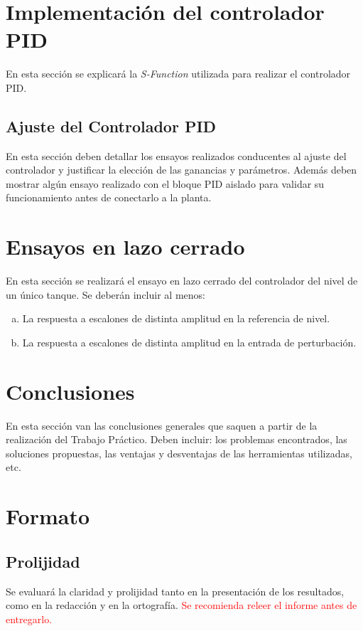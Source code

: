 \documentclass[10pt]{article}
\begin{document}
\section{Implementación del controlador PID}
En esta sección se explicará la \textit{S-Function} utilizada para realizar el controlador PID.

\subsection{Ajuste del Controlador PID}
En esta sección deben detallar los ensayos realizados conducentes al ajuste del controlador y justificar la elección de las ganancias y parámetros. Además deben mostrar algún ensayo realizado con el bloque PID aislado para validar su funcionamiento antes de conectarlo a la planta.

\section{Ensayos en lazo cerrado}
En esta sección se realizará el ensayo en lazo cerrado del controlador del nivel de un único tanque. Se deberán incluir al menos:

\begin{enumerate}[a)] 
\item La respuesta a escalones de distinta amplitud en la referencia de nivel.
\item La respuesta a escalones de distinta amplitud en la entrada de perturbación.
\end{enumerate}

\section{Conclusiones}
En esta sección van las conclusiones generales que saquen a partir de la realización del Trabajo Práctico. Deben incluir: los problemas encontrados, las soluciones propuestas, las ventajas y desventajas de las herramientas utilizadas, etc.

\section{Formato}
\subsection{Prolijidad}
Se evaluará la claridad y prolijidad tanto en la presentación de los resultados, como en la redacción y en la ortografía. \textcolor{red}{Se recomienda releer el informe antes de entregarlo.}
\end{document}
